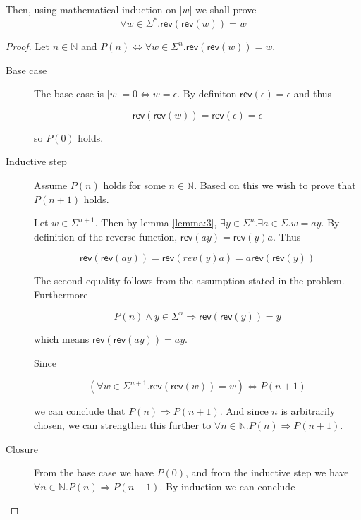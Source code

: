 \documentclass{article}
\begin{document}
Then, using mathematical induction on $|w|$ we shall prove $$\forall w \in \Sigma^* . \mathsf{rev}(\mathsf{rev}(w)) = w$$
\begin{proof}

    Let $n \in \mathbb{N}$ and $P(n) \Leftrightarrow \forall w \in \Sigma^n . \mathsf{rev}(\mathsf{rev}(w)) = w$.

    \begin{description}
        \item[Base case]
            The base case is $|w|=0 \Leftrightarrow w = \epsilon$.
            By definiton $\mathsf{rev}(\epsilon) = \epsilon$ and thus

            $$\mathsf{rev}(\mathsf{rev}(w)) = \mathsf{rev}(\epsilon) = \epsilon$$

            so $P(0)$ holds.
            
        \item[Inductive step] Assume $P(n)$ holds for some $n \in \mathbb{N}$. Based on this we wish to prove that $P(n+1)$ holds.

        Let $w \in \Sigma^{n+1}$. Then by lemma \ref{lemma:3}, $\exists y \in \Sigma^n. \exists a \in \Sigma. w = ay$. By definition of the reverse function, $\mathsf{rev}(ay) = \mathsf{rev}(y)a$. Thus

        $$\mathsf{rev}(\mathsf{rev}(ay)) = \mathsf{rev}(rev(y)a) = a\mathsf{rev}(\mathsf{rev}(y))$$

        The second equality follows from the assumption stated in the problem. Furthermore
        
        $$P(n) \land y \in \Sigma^n \Rightarrow \mathsf{rev}(\mathsf{rev}(y)) = y$$

        which means $\mathsf{rev}(\mathsf{rev}(ay)) = ay$.

        Since 
        
        $$(\forall w \in \Sigma^{n+1} . \mathsf{rev}(\mathsf{rev}(w)) = w) \Leftrightarrow P(n+1)$$

        we can conclude that $P(n) \Rightarrow P(n+1)$. And since $n$ is arbitrarily chosen, we can strengthen this further to $\forall n \in \mathbb{N} . P(n) \Rightarrow P(n+1)$. 
        

    \item[Closure]
        From the base case we have $P(0)$, and from the inductive step we have $\forall n \in \mathbb{N} . P(n) \Rightarrow P(n+1)$. By induction we can conclude

        \begin{prooftree}
        \end{prooftree}


\end{description}
\end{proof}
\end{document}
